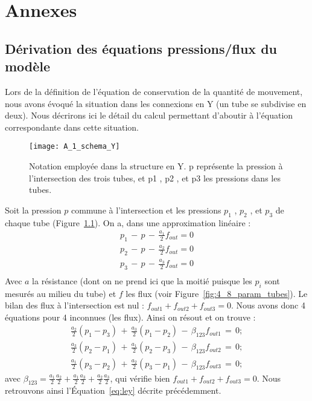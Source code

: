 \chapter{Annexes}
\minitoc

\section{Dérivation des équations pressions/flux du modèle}
\label{sec:deriveq}
Lors de la définition de l’équation de conservation de la quantité de mouvement, nous avons
évoqué la situation dans les connexions en Y (un tube se subdivise en deux). Nous décrirons ici le détail
du calcul permettant d’aboutir à l’équation correspondante dans cette situation.
\begin{figure}[!t]
\centering
\texttt{[image: A\_1\_schema\_Y]}
\caption{Notation employée dans la structure en Y. p représente la pression à l’intersection des trois tubes, et p1 , p2 , et p3
les pressions dans les tubes.}
\label{fig:A_1_schema_y}	
\end{figure}
Soit la pression $p$ commune à l’intersection et les pressions $p_1$ , $p_2$ , et $p_3$ de chaque tube (Figure~\ref{fig:A_1_schema_y}). On
a, dans une approximation linéaire :
\begin{eqnarray}
p_1\,-\,p\,-\,\frac{a_1}{2}f_{out}=0\\
p_2\,-\,p\,-\,\frac{a_2}{2}f_{out}=0\\
p_3\,-\,p\,-\,\frac{a_3}{2}f_{out}=0\\
\end{eqnarray}
Avec $a$ la résistance (dont on ne prend ici que la moitié puisque les $p_i$ sont mesurés au milieu du tube)
et $f$ les flux (voir Figure~\ref{fig:4_8_param_tubes}). Le bilan des flux à l’intersection est nul : $f_{out1} + f_{out2} + f_{out3}=0$. Nous
avons donc 4 équations pour 4 inconnues (les flux). Ainsi on résout et on trouve :
\begin{eqnarray}
\frac{a_2}{2}(p_1-p_3)\,+\,\frac{a_3}{2}(p_1-p_2)\,-\,\beta_{123}f_{out1}\,=\,0;\\
\frac{a_3}{2}(p_2-p_1)\,+\,\frac{a_1}{2}(p_2-p_3)\,-\,\beta_{123}f_{out2}\,=\,0;\\
\frac{a_1}{2}(p_3-p_2)\,+\,\frac{a_2}{2}(p_3-p_1)\,-\,\beta_{123}f_{out3}\,=\,0;
\end{eqnarray}
avec $\beta_{123}=\frac{a_1}{2}\frac{a_2}{2}+\frac{a_1}{2}\frac{a_3}{2}+\frac{a_2}{2}\frac{a_3}{2}$, qui vérifie bien $f_{out1} + f_{out2} + f_{out3}=0$. Nous retrouvons ainsi l’Équation~\ref{eq:ley} décrite précédemment.
